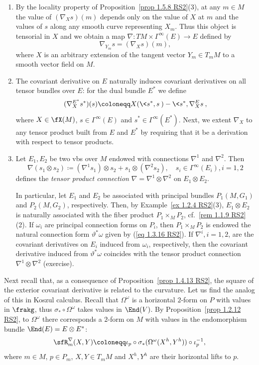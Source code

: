 \begin{rem}\label{rem 1.5.9 RS2}
    \begin{enumerate}
        \item By the locality property of Proposition~\ref{prop 1.5.8 RS2}(3), at any $m\in M$ the value of $(\nabla_X s)(m)$ depends only on the value of $X$ at $m$ and the values of $s$ along any smooth curve representing $X_m$. Thus this object is tensorial in $X$ and we obtain a map $\nabla:TM\times\Gamma^\infty(E)\to E$ defined by
        \[\nabla_{Y_m}s=(\nabla_X s)(m),\]
        where $X$ is an arbitrary extension of the tangent vector $Y_m\in T_mM$ to a smooth vector field on $M$.
        \item The covariant derivative on $E$ naturally induces covariant derivatives on all tensor bundles over $E$: for the dual bundle $E^\ast$ we define
        \[(\nabla^{E^\ast}_X s^\ast)(s)\coloneqq X(\<s^\ast,s\>)-\<s^\ast,\nabla_X^E s\>,\]
        where $X\in\fX(M)$, $s\in\Gamma^\infty(E)$ and $s^\ast\in\Gamma^\infty(E^\ast)$. Next, we extent $\nabla_X$ to any tensor product built from $E$ and $E^\ast$ by requiring that it be a derivation with respect to tensor products.
        \item Let $E_1,E_2$ be two \glspl{vb} over $M$ endowed with connections $\nabla^1$ and $\nabla^2$. Then
        \[\nabla(s_1\otimes s_2)\coloneqq (\nabla^1 s_1)\otimes s_2+s_1\otimes (\nabla^2 s_2), \quad s_i\in\Gamma^\infty(E_i),i=1,2\]
        defines the \emph{tensor product connection} $\nabla=\nabla^1\otimes\nabla^2$ on $E_1\otimes E_2$.

        In particular, let $E_1$ and $E_2$ be associated with principal bundles $P_1(M,G_1)$ and $P_2(M,G_2)$, respectively. Then, by Example~\ref{ex 1.2.4 RS2}(3), $E_1\otimes E_2$ is naturally associated with the fiber product $P_1\times_M P_2$, cf.\ \ref{rem 1.1.9 RS2}(2). If $\omega_i$ are principal connection forms on $P_i$, then $P_1\times_M P_2$ is endowed the natural connection form $\vartheta^\ast\omega$ given by (\ref{eq 1.3.16 RS2}). If $\nabla^i,i=1,2$, are the covariant derivatives on $E_i$ induced from $\omega_i$, respectively, then the covariant derivative induced from $\vartheta^\ast\omega$ coincides with the tensor product connection $\nabla^1\otimes \nabla^2$ (exercise).
    \end{enumerate}
\end{rem}

Next recall that, as a consequence of Proposition~\ref{prop 1.4.13 RS2}, the square of the exterior covariant derivative is related to the curvature. Let us find the analog of this in Koszul calculus. Recall that $\Omega^\omega$ is a horizontal $2$-form on $P$ with values in $\frakg$, thus $\sigma_\ast\circ \Omega^\omega$ takes values in $\End(V)$. By Proposition~\ref{prop 1.2.12 RS2}, to $\Omega^\omega$ there corresponds a $2$-form on $M$ with values in the endomorphism bundle $\End(E)=E\otimes E^\ast$:
\[\sfR^\nabla_m(X,Y)\coloneqq \iota_p\circ \sigma_\ast(\Omega^\omega(X^h,Y^h))\circ\iota_p^{-1},\label{eq def Rnabla}\]
where $m\in M$, $p\in P_m$, $X,Y\in T_mM$ and $X^h,Y^h$ are their horizontal lifts to $p$.

